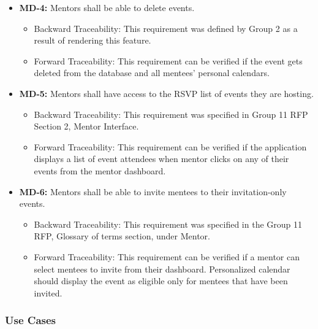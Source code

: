 \begin{itemize}[label=$\bullet$]
    \item \textbf{MD-4:} Mentors shall be able to delete events.
    \begin{itemize}
        \item Backward Traceability: This requirement was defined by Group 2 as
        a result of rendering this feature.

        \item Forward Traceability: This requirement can be verified if the
        event gets deleted from the database and all mentees' personal
        calendars.
    \end{itemize}
    
    \item \textbf{MD-5:} Mentors shall have access to the RSVP list of events
    they are hosting.
    \begin{itemize}
        \item Backward Traceability: This requirement was specified in Group 11
        RFP Section 2, Mentor Interface.

        \item Forward Traceability: This requirement can be verified if the
        application displays a list of event attendees when mentor clicks on any
        of their events from the mentor dashboard.
    \end{itemize}
    
    \item \textbf{MD-6:} Mentors shall be able to invite mentees to their
    invitation-only events.
    \begin{itemize}
        \item Backward Traceability: This requirement was specified in the Group
        11 RFP, Glossary of terms section, under Mentor.

        \item Forward Traceability: This requirement can be verified if a mentor
        can select mentees to invite from their dashboard. Personalized calendar
        should display the event as eligible only for mentees that have been
        invited.
    \end{itemize}
\end{itemize}



\subsubsection{Use Cases}

